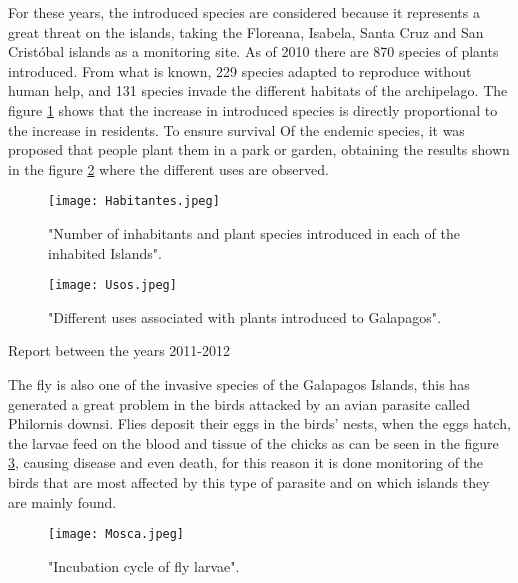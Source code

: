 \documentclass[10pt,english, openany]{book}
\begin{document}
For these years, the introduced species are considered because it represents a great threat on the islands, taking the Floreana, Isabela, Santa Cruz and San Cristóbal islands as a monitoring site. As of 2010 there are 870 species of plants introduced. From what is known, 229 species adapted to reproduce without human help, and 131 species invade the different habitats of the archipelago. The figure \ref{fig15:spect} shows that the increase in introduced species is directly proportional to the increase in residents. To ensure survival Of the endemic species, it was proposed that people plant them in a park or garden, obtaining the results shown in the figure \ref{fig16:spect} where the different uses are observed.\cite{2010}

\pagebreak

\begin{figure}[h!]
    \centering
    \texttt{[image: Habitantes.jpeg]}
    \caption{"Number of inhabitants and plant species introduced in each of the inhabited Islands".\cite{2010}}
    \label{fig15:spect}
\end{figure}

\vspace{1cm}

\begin{figure}[h!]
    \centering
    \texttt{[image: Usos.jpeg]}
    \caption{"Different uses associated with plants introduced to Galapagos".\cite{2010}}
    \label{fig16:spect}
\end{figure}

\pagebreak

Report between the years 2011-2012

The fly is also one of the invasive species of the Galapagos Islands, this has generated a great problem in the birds attacked by an avian parasite called Philornis downsi. Flies deposit their eggs in the birds' nests, when the eggs hatch, the larvae feed on the blood and tissue of the chicks as can be seen in the figure \ref{fig17:spect}, causing disease and even death, for this reason it is done monitoring of the birds that are most affected by this type of parasite and on which islands they are mainly found.\cite{Galapagos2012}

\begin{figure}[h!]
    \centering
    \texttt{[image: Mosca.jpeg]}
    \caption{"Incubation cycle of fly larvae".\cite{Galapagos2012}}
    \label{fig17:spect}
\end{figure}
\end{document}
